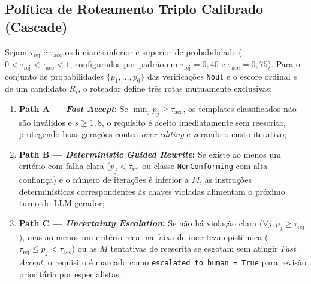 \subsection{Política de Roteamento Triplo Calibrado (Cascade)}
Sejam $\tau_{\text{rej}}$ e $\tau_{\text{acc}}$ os limiares inferior e superior de probabilidade ($0 < \tau_{\text{rej}} < \tau_{\text{acc}} < 1$, configurados por padrão em $\tau_{\text{rej}} = 0{,}40$ e $\tau_{\text{acc}} = 0{,}75$). Para o conjunto de probabilidades $\{p_1, \dots, p_6\}$ das verificações \texttt{Noul} e o escore ordinal $s$ de um candidato $R_i$, o roteador define três rotas mutuamente exclusivas:
\begin{enumerate}
    \item \textbf{Path A --- \textit{Fast Accept}:} Se $\min_j p_j \ge \tau_{\text{acc}}$, os templates classificados não são inválidos e $s \ge 1{,}8$, o requisito é aceito imediatamente sem reescrita, protegendo boas gerações contra \textit{over-editing} e zerando o custo iterativo;
    \item \textbf{Path B --- \textit{Deterministic Guided Rewrite}:} Se existe ao menos um critério com falha clara ($p_j < \tau_{\text{rej}}$ ou classe \texttt{NonConforming} com alta confiança) e o número de iterações é inferior a $M$, as instruções determinísticas correspondentes às chaves violadas alimentam o próximo turno do LLM gerador;
    \item \textbf{Path C --- \textit{Uncertainty Escalation}:} Se não há violação clara ($\forall j, p_j \ge \tau_{\text{rej}}$), mas ao menos um critério recai na faixa de incerteza epistêmica ($\tau_{\text{rej}} \le p_j < \tau_{\text{acc}}$) ou as $M$ tentativas de reescrita se esgotam sem atingir \textit{Fast Accept}, o requisito é marcado como \texttt{escalated\_to\_human = True} para revisão prioritária por especialistas.
\end{enumerate}
